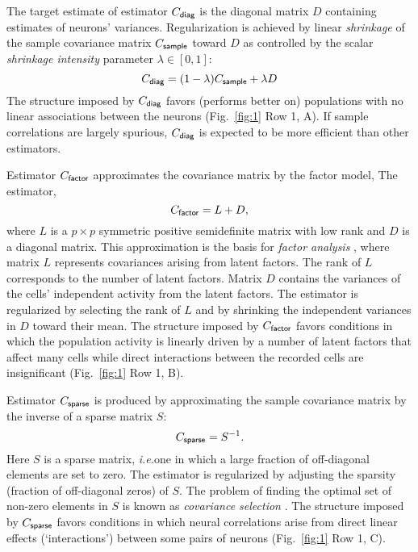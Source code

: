 The target estimate of estimator $C_{\sf diag}$ is the diagonal matrix $D$ containing estimates of neurons' variances. Regularization is achieved by linear \emph{shrinkage} of the sample covariance matrix $C_{\sf sample}$ toward $D$ as controlled by the scalar \emph{shrinkage intensity} parameter $\lambda \in [0, 1]$:
\begin{equation}\label{eq:c-diag}
C_{\sf diag} = (1-\lambda) C_{\sf sample} + \lambda D
\end{equation}
The structure imposed by $C_{\sf diag}$ favors (performs better  on) populations   with no linear associations between the neurons (Fig.~\ref{fig:1} Row 1, A).  If sample correlations are largely spurious, $C_{\sf diag}$ is expected to be more efficient than other estimators.

Estimator $C_{\sf factor}$ approximates the covariance matrix by the factor model, The estimator,
\begin{equation}\label{eq:c-factor}
C_{\sf factor} = L + D,
\end{equation}
where $L$ is a $p\times p$ symmetric positive semidefinite matrix with low rank and $D$ is a diagonal matrix. 
This approximation is the basis for \emph{factor analysis} \cite{Anderson:2003}, where matrix $L$ represents covariances arising from latent factors. The rank of $L$ corresponds to the number of latent factors. Matrix $D$ contains the variances of the cells' independent activity from the latent factors. The estimator is regularized by selecting the rank of $L$ and by shrinking the independent variances in $D$ toward their mean.
The structure imposed by $C_{\sf factor}$ favors conditions in which the population activity is linearly driven by a number of latent factors that affect many cells while direct interactions between the recorded cells are insignificant (Fig.~\ref{fig:1} Row 1, B).

Estimator $C_{\sf sparse}$ is produced by approximating the sample covariance matrix by the inverse of a sparse matrix $S$:
\begin{equation}\label{eq:c-sparse}
C_{\sf sparse} = S^{-1}.
\end{equation}
Here $S$ is a sparse matrix, \emph{i.e.}\;one in which a large fraction of off-diagonal elements are set to zero.  
The estimator is regularized by adjusting the sparsity (fraction of off-diagonal zeros) of $S$. 
The problem of finding the optimal set of non-zero elements in $S$ is known as \emph{covariance selection} \cite{Dempster:1972}. 
The structure imposed by $C_{\sf sparse}$ favors conditions in which neural correlations arise from direct linear effects (`interactions') between some pairs of neurons (Fig.~\ref{fig:1} Row 1, C).

